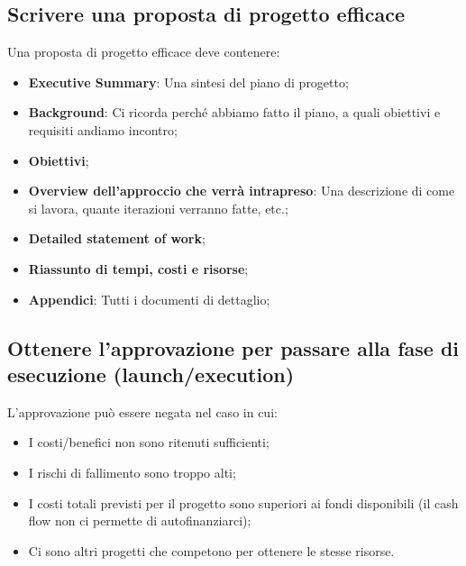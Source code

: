 \subsection{Scrivere una proposta di progetto efficace}
Una proposta di progetto efficace deve contenere:
\begin{itemize}
	\item \textbf{Executive Summary}: Una sintesi del piano di progetto;
	\item \textbf{Background}: Ci ricorda perché abbiamo fatto il piano, a quali obiettivi e requisiti andiamo incontro;
	\item \textbf{Obiettivi};
	\item \textbf{Overview dell'approccio che verrà intrapreso}: Una descrizione di come si lavora, quante iterazioni verranno fatte, etc.;
	\item \textbf{Detailed statement of work};
	\item \textbf{Riassunto di tempi, costi e risorse};
	\item \textbf{Appendici}: Tutti i documenti di dettaglio;
\end{itemize}
\subsection{Ottenere l’approvazione per passare alla fase di esecuzione (launch/execution)}
L'approvazione può essere negata nel caso in cui:
\begin{itemize}
	\item I costi/benefici non sono ritenuti sufficienti;
	\item I rischi di fallimento sono troppo alti;
	\item I costi totali previsti per il progetto sono superiori ai fondi disponibili (il cash flow non ci permette di autofinanziarci);
	\item Ci sono altri progetti che competono per ottenere le stesse risorse.
\end{itemize}
